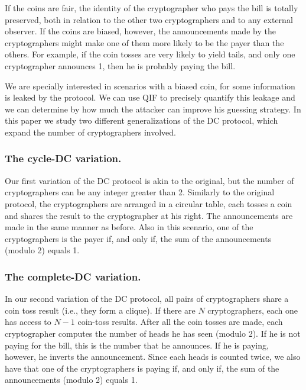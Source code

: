 If the coins are fair, the identity of the cryptographer who pays the bill 
is totally preserved, both in relation to the other two cryptographers and to 
any external observer. 
If the coins are biased, however, the announcements made by the cryptographers 
might make one of them more likely to be the payer than the others. 
For example, if the coin tosses are very likely to yield tails, and only one 
cryptographer announces 1, then he is probably paying the bill.

We are specially interested in scenarios with a biased coin, for some 
information is leaked by the protocol.
We can use QIF to precisely quantify this leakage and we can determine 
by how much the attacker can improve his guessing strategy.
In this paper we study two different generalizations of the DC protocol, 
which expand the number of cryptographers involved.

\subsubsection{The cycle-DC variation.}

Our first variation of the DC protocol is akin to the original,
but the number of cryptographers can be any integer greater than 2.
Similarly to the original protocol, the cryptographers are arranged in 
a circular table, each tosses a coin and shares the result to the 
cryptographer at his right. 
The announcements are made in the same manner as before.
Also in this scenario, one of the cryptographers is the payer 
if, and only if, the sum of the announcements (modulo 2) equals 1. 

\subsubsection{The complete-DC variation.}

In our second variation of the DC protocol, all pairs of cryptographers 
share a coin toss result (i.e., they form a clique). 
If there are $N$ cryptographers, each one has access to $N{-}1$ coin-toss results.
After all the coin tosses are made, each cryptographer computes the number 
of heads he has seen (modulo 2). 
If he is not paying for the bill, this is the number that he announces. 
If he is paying, however, he inverts the announcement. 
Since each heads is counted twice, we also have that one of the 
cryptographers is paying if, and only if, the sum of the announcements (modulo 2) 
equals 1. 

